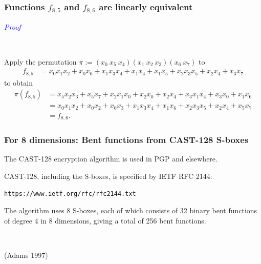\documentclass[pdf,sprung,slideColor,nocolorBG]{beamer}
\newenvironment{colortheme}[1]{
\def\ProvidesPackageRCS $##1${\relax}
\renewcommand{\ProcessOptions}{\relax}
\makeatletter

\makeatother
}{}
\newcommand{\slidecite}[1]{\tiny{(#1)}\normalsize{}}
\newcommand{\Emph}[1]{\emph{\textcolor{blue}{#1}}}
\begin{document}
\begin{colortheme}{jubata}
\begin{frame}[fragile]
\frametitle{Functions $f_{8,5}$ and $f_{8,6}$ are linearly equivalent}

\Emph{Proof}

~

Apply the permutation $\pi := (x_0\ x_5\ x_4)(x_1\ x_2\ x_3)(x_6\ x_7)$ to
\small{
\begin{align*}
f_{8,5}
&=
x_{0} x_{1} x_{2} + x_{0} x_{6} + x_{1} x_{3} x_{4} + x_{1} x_{4} + x_{1} x_{5} + x_{2} x_{3} x_{5} + x_{2} x_{4} + x_{3} x_{7}
\end{align*}
}\normalsize{}
to obtain
\small{
\begin{align*}
\pi(f_{8,5})
&=
x_{5} x_{2} x_{3} + x_{5} x_{7} + x_{2} x_{1} x_{0} + x_{2} x_{0} + x_{2} x_{4} + x_{3} x_{1} x_{4} + x_{3} x_{0} + x_{1} x_{6}
\\
&=
x_{0} x_{1} x_{2} + x_{0} x_{2} + x_{0} x_{3} + x_{1} x_{3} x_{4} + x_{1} x_{6} + x_{2} x_{3} x_{5} + x_{2} x_{4} + x_{5} x_{7}
\\
&= f_{8,6}.
\end{align*}
}\normalsize{}
\end{frame}

\end{colortheme}

\begin{colortheme}{seagull}

\begin{frame}[fragile]
\frametitle{For 8 dimensions: Bent functions from CAST-128 S-boxes}

The CAST-128 encryption algorithm is used in PGP and elsewhere.

CAST-128, including the S-boxes, is specified by IETF RFC 2144:
\begin{verbatim}
https://www.ietf.org/rfc/rfc2144.txt
\end{verbatim}

The algorithm uses 8 S-boxes,
each of which consists of 32 binary bent functions of degree 4 in 8 dimensions,
giving a total of 256 bent functions.

~

\slidecite{Adams 1997}
\end{frame}

\end{colortheme}
\end{document}
